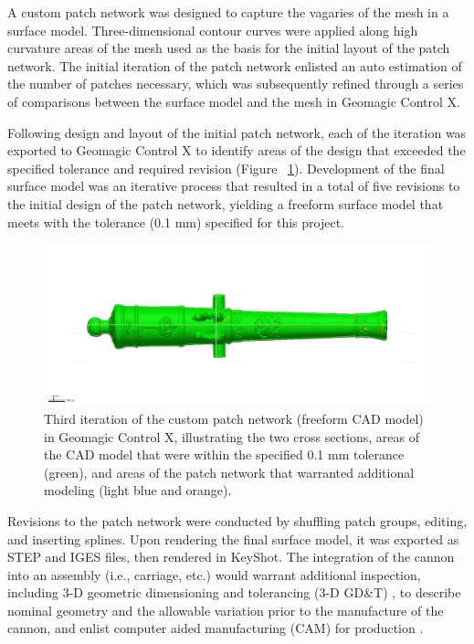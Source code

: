\documentclass[review]{elsarticle}
\begin{document}
A custom patch network was designed to capture the vagaries of the mesh in a surface model. Three-dimensional contour curves were applied along high curvature areas of the mesh used as the basis for the initial layout of the patch network. The initial iteration of the patch network enlisted an auto estimation of the number of patches necessary, which was subsequently refined through a series of comparisons between the surface model and the mesh in Geomagic Control X.

Following design and layout of the initial patch network, each of the iteration was exported to Geomagic Control X to identify areas of the design that exceeded the specified tolerance and required revision (Figure ~\ref{fig:fig06}). Development of the final surface model was an iterative process that resulted in a total of five revisions to the initial design of the patch network, yielding a freeform surface model that meets with the tolerance (0.1 mm) specified for this project.

\begin{figure}[ht]\centering
\includegraphics[width=\linewidth]{fig06.png}
\caption{Third iteration of the custom patch network (freeform CAD model) in Geomagic Control X, illustrating the two cross sections, areas of the CAD model that were within the specified 0.1 mm tolerance (green), and areas of the patch network that warranted additional modeling (light blue and orange).}
\label{fig:fig06}
\end{figure}

Revisions to the patch network were conducted by shuffling patch groups, editing, and inserting splines. Upon rendering the final surface model, it was exported as STEP and IGES files, then rendered in KeyShot. The integration of the cannon into an assembly (i.e., carriage, etc.) would warrant additional inspection, including 3-D geometric dimensioning and tolerancing (3-D GD\&T) \citep{RN5875,RN5874,RN5876}, to describe nominal geometry and the allowable variation prior to the manufacture of the cannon, and enlist computer aided manufacturing (CAM) for production \citep{RN5877,RN5878}.
\end{document}
